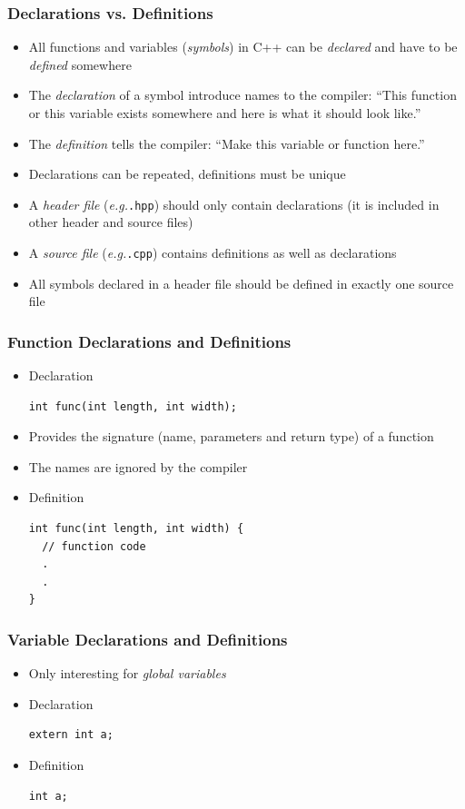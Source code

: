 \documentclass{slides}
\newcommand{\eg}{\textit{e.\thinspace g.}\xspace}
\begin{document}
\begin{frame}[fragile]
  \frametitle{Declarations vs. Definitions}
  \begin{itemize}
  \item All functions and variables (\emph{symbols}) in C++ can be
    \emph{declared} and have to be \emph{defined} somewhere
  \item The \emph{declaration} of a symbol introduce names to the
    compiler: ``This function or this variable exists somewhere and
    here is what it should look like.''
  \item The \emph{definition} tells the compiler: ``Make this variable
    or function here.''
  \item Declarations can be repeated, definitions must be unique
  \item A \emph{header file} (\eg \texttt{.hpp}) should only contain
    declarations (it is included in other header and source files)
  \item A \emph{source file} (\eg \texttt{.cpp}) contains definitions
    as well as declarations
  \item All symbols declared in a header file should be defined in
    exactly one source file
  \end{itemize}
\end{frame}

\begin{frame}[fragile]
  \frametitle{Function Declarations and Definitions}
  \begin{itemize}
  \item Declaration
    \begin{lstlisting}
int func(int length, int width);
    \end{lstlisting}
  \item Provides the signature (name, parameters and return type) of a
    function
  \item The names are ignored by the compiler
  \item Definition
    \begin{lstlisting}
int func(int length, int width) {
  // function code
  .
  .
}
    \end{lstlisting}
  \end{itemize}
\end{frame}

\begin{frame}[fragile]
  \frametitle{Variable Declarations and Definitions}
  \begin{itemize}
  \item Only interesting for \emph{global variables}
  \item Declaration
    \begin{lstlisting}
extern int a;
    \end{lstlisting}
  \item Definition
    \begin{lstlisting}
int a;
    \end{lstlisting}
  \end{itemize}
\end{frame}
\end{document}
